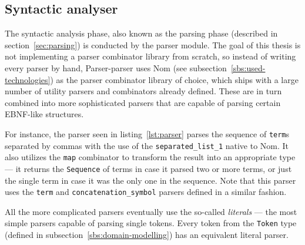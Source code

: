 \documentclass[english,engineering]{wizthesis}
\newcommand{\todo}[1]{%
  \textcolor{red}{[\textbf{TODO}\ifx&#1&{}\else{ }\fi\emph{#1}]}%
}
\newcommand{\thisproject}{Parser-parser}
\begin{document}
\subsection{Syntactic analyser}

The syntactic analysis phase, also known as the parsing phase (described in
section~\ref{sec:parsing}) is conducted by the parser module. The goal of this
thesis is not implementing a parser combinator library from scratch, so instead
of writing every parser by hand, \thisproject{} uses Nom (see
subsection~\ref{sbs:used-technologies}) as the parser combinator library of
choice, which ships with a large number of utility parsers and combinators
already defined. These are in turn combined into more sophisticated parsers that
are capable of parsing certain EBNF-like structures.

For instance, the parser seen in listing~\ref{lst:parser} parses the sequence of
\texttt{term}s separated by commas with the use of the
\texttt{separated\_list\_1} native to Nom. It also utilizes the \texttt{map}
combinator to transform the result into an appropriate type --- it returns the
\texttt{Sequence} of terms in case it parsed two or more terms, or just the
single term in case it was the only one in the sequence. Note that this parser
uses the \texttt{term} and \texttt{concatenation\_symbol} parsers defined
in a similar fashion.


All the more complicated parsers eventually use the so-called \emph{literals}
--- the most simple parsers capable of parsing single tokens. Every token from
the \texttt{Token} type (defined in subsection~\ref{sbs:domain-modelling}) has
an equivalent literal parser.
\end{document}
